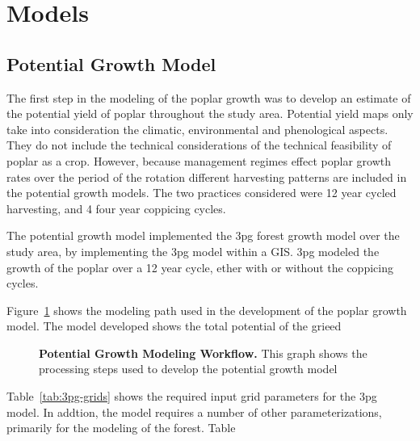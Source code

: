 \documentclass[10pt]{article}
\begin{document}
\section*{Models}

\subsection*{Potential Growth Model}

The first step in the modeling of the poplar growth was to develop an
estimate of the potential yield of poplar throughout the study area.
Potential yield maps only take into consideration the climatic,
environmental and phenological aspects.  They do not include the
technical considerations of the technical feasibility of poplar as a
crop.  However, because management regimes effect poplar growth rates
over the period of the rotation different harvesting patterns are
included in the potential growth models.  The two practices considered
were 12 year cycled harvesting, and 4 four year coppicing cycles.

The potential growth model implemented the \ac{3pg} forest growth
model over the study area, by implementing the \ac{3pg} model within a
\ac{GIS}.  \ac{3pg} modeled the growth of the poplar over a 12 year
cycle, ether with or without the coppicing cycles.  

Figure~\ref{fig:growth-model} shows the modeling path used in the
development of the poplar growth model. The model developed shows the
total potential of the grieed

\begin{figure}[!ht]
\begin{center}
\end{center}
\caption{ {\bf Potential Growth Modeling Workflow.} This graph shows
  the processing steps used to develop the potential growth model }
\label{fig:growth-model}
\end{figure}

Table~\ref{tab:3pg-grids} shows the required input grid parameters for
the \ac{3pg} model.  In addtion, the model requires a number of other
parameterizations, primarily for the modeling of the forest. Table
\end{document}
